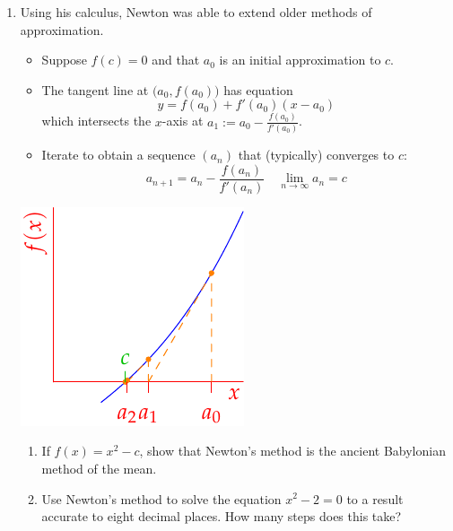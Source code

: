 \begin{exercises}{}{}
\begin{enumerate}
	
	\item Using his calculus, Newton was able to extend older methods of approximation.\par
	\begin{minipage}[t]{0.72\linewidth}\vspace{-5pt}
		\begin{itemize}\itemsep0pt
		  \item Suppose $f(c)=0$ and that $a_0$ is an initial approximation to $c$.
		  \item The tangent line at $\bigl(a_0,f(a_0)\bigr)$ has equation
		  \[
		  	y=f(a_0)+f'(a_0)(x-a_0)
		  \]
		  which intersects the $x$-axis at $a_1:=a_0-\frac{f(a_0)}{f'(a_0)}$.
		  \item Iterate to obtain a sequence $(a_n)$ that (typically) converges to $c$:
		  \[
		  	a_{n+1}=a_n-\frac{f(a_n)}{f'(a_n)}\quad \lim_{n\to\infty}a_n=c
		  \]
		\end{itemize}
	\end{minipage}
	\hfill
	\begin{minipage}[t]{0.27\linewidth}\vspace{-5pt}
		\flushright\includegraphics{newtonsmethod}
	\end{minipage}\par
	\begin{enumerate}
	  \item If $f(x)=x^2-c$, show that Newton's method is the ancient Babylonian method of the mean.
		\item%
		Use Newton's method to solve the equation $x^2-2=0$ to a result accurate to eight decimal places. How many steps does this take?
	\end{enumerate}


\end{enumerate}
\end{exercises}
